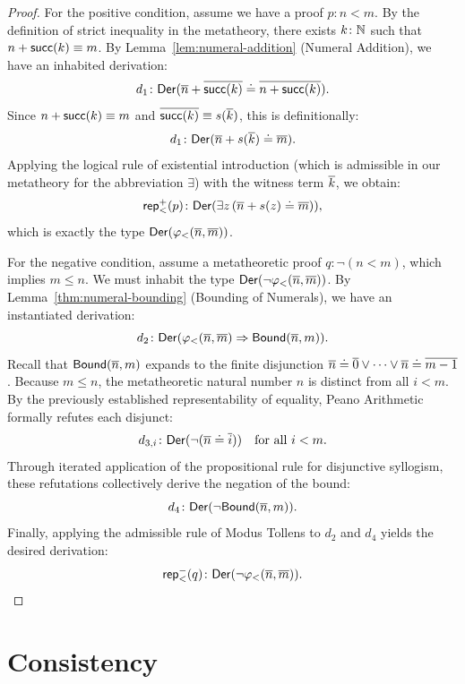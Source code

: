 \begin{proof}
    For the positive condition, assume we have a proof $p\colon n < m$. By the definition of strict inequality in the metatheory, there exists $k\colon\N$ such that $n + \mathsf{succ}(k) \equiv m$. By Lemma~\ref{lem:numeral-addition} (Numeral Addition), we have an inhabited derivation:
    \[
        d_1\colon\fun{Der}(\num{n} + \num{\fun{succ}(k)} \doteq \num{n + \fun{succ}(k)}).
    \]
    Since $n + \mathsf{succ}(k) \equiv m$ and ${\overline{\mathsf{succ}(k)}} \equiv s({\overline{k}})$, this is definitionally:
    \[
        d_1\colon\fun{Der}(\num{n} + s(\num{k}) \doteq \num{m}).
    \]
    Applying the logical rule of existential introduction (which is admissible in our metatheory for the abbreviation $\exists$) with the witness term ${\overline{k}}$, we obtain:
    \[
        \fun{rep}_{<}^+(p)\colon\fun{Der}(\exists z\,(\num{n} + s(z) \doteq \num{m})),
    \]
    which is exactly the type $\mathsf{Der}(\varphi_<({\overline{n}}, {\overline{m}}))$.

    For the negative condition, assume a metatheoretic proof $q\colon \neg(n < m)$, which implies $m \le n$. We must inhabit the type $\mathsf{Der}(\neg\varphi_<({\overline{n}}, {\overline{m}}))$. 
    By Lemma~\ref{thm:numeral-bounding} (Bounding of Numerals), we have an instantiated derivation:
    \[
        d_2\colon\fun{Der}(\varphi_<(\num{n}, \num{m}) \imp \fun{Bound}(\num{n}, m)).
    \]
    Recall that $\mathsf{Bound}({\overline{n}}, m)$ expands to the finite disjunction ${\overline{n}} \doteq {\overline{0}} \lor \dots \lor {\overline{n}} \doteq {\overline{m-1}}$.
    Because $m \le n$, the metatheoretic natural number $n$ is distinct from all $i < m$. By the previously established representability of equality, Peano Arithmetic formally refutes each disjunct:
    \[
        d_{3,i}\colon\fun{Der}(\neg(\num{n} \doteq \num{i})) \quad \text{for all } i < m.
    \]
    Through iterated application of the propositional rule for disjunctive syllogism, these refutations collectively derive the negation of the bound:
    \[
        d_4\colon\fun{Der}(\neg\fun{Bound}(\num{n}, m)).
    \]
    Finally, applying the admissible rule of Modus Tollens to $d_2$ and $d_4$ yields the desired derivation:
    \[
        \fun{rep}_{<}^-(q)\colon\fun{Der}(\neg\varphi_<(\num{n}, \num{m})).
    \]
\end{proof}



\section{Consistency}

